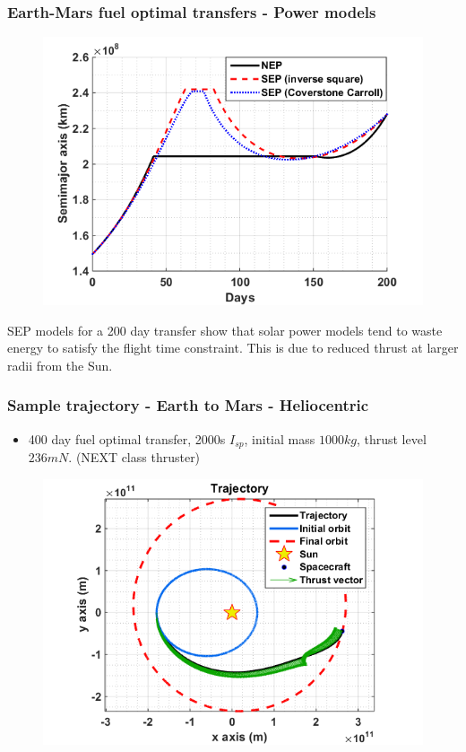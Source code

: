 \documentclass{beamer}
\begin{document}
\begin{frame}
\frametitle{Earth-Mars fuel optimal transfers - Power models}
\vspace{-3.25mm}
\begin{figure}
	\centering\includegraphics[width=0.60\linewidth]{Imgs/Semimaj_axis.png}
\end{figure}
\vspace{-3.00mm}
SEP models for a 200 day transfer show that solar power models tend to waste energy to satisfy the flight time constraint. This is due to reduced thrust at larger radii from the Sun.
\end{frame}

\begin{frame}
\frametitle{Sample trajectory - Earth to Mars - Heliocentric}
\vspace{-2.50mm}
\begin{itemize}
	\item 400 day fuel optimal transfer, 2000s $I_{sp}$, initial mass $1000kg$, thrust level $236mN$. (NEXT class thruster)
\end{itemize}
\begin{figure}
	\vspace{-1.50mm}
	\centering\includegraphics[width=0.70\linewidth]{Imgs/Sample_Traj.png}
\end{figure}
\end{frame}
\end{document}

